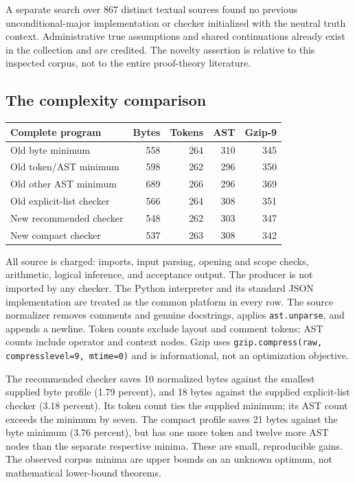 \documentclass[11pt,letterpaper]{article}
\theoremstyle{definition}\newtheorem{definition}[theorem]{Definition}
\theoremstyle{remark}\newtheorem{remark}[theorem]{Remark}
\begin{document}
A separate search over 867 distinct textual sources found no previous
unconditional-major implementation or checker initialized with the
neutral truth context. Administrative true assumptions and shared
continuations already exist in the collection and are credited. The
novelty assertion is relative to this inspected corpus, not to the entire
proof-theory literature.

\subsection{The complexity comparison}


\begin{center}\small
\begin{tabular}{lrrrr}
\toprule
Complete program & Bytes & Tokens & AST & Gzip-9\\
\midrule
Old byte minimum & 558 & 264 & 310 & 345\\
Old token/AST minimum & 598 & 262 & 296 & 350\\
Old other AST minimum & 689 & 266 & 296 & 369\\
Old explicit-list checker & 566 & 264 & 308 & 351\\
New recommended checker & 548 & 262 & 303 & 347\\
New compact checker & 537 & 263 & 308 & 342\\
\bottomrule
\end{tabular}
\end{center}



All source is charged: imports, input parsing, opening and scope checks,
arithmetic, logical inference, and acceptance output. The producer is
not imported by any checker. The Python interpreter and its standard
JSON implementation are treated as the common platform in every row.
The source normalizer removes comments and genuine docstrings, applies
\texttt{ast.unparse}, and appends a newline. Token counts exclude layout
and comment tokens; AST counts include operator and context nodes.
Gzip uses \texttt{gzip.compress(raw, compresslevel=9, mtime=0)} and is
informational, not an optimization objective.

The recommended checker saves 10 normalized bytes against the smallest
supplied byte profile (1.79 percent), and 18 bytes against the supplied
explicit-list checker (3.18 percent). Its token count ties the supplied
minimum; its AST count exceeds the minimum by seven. The compact profile
saves 21 bytes against the byte minimum (3.76 percent), but has one more
token and twelve more AST nodes than the separate respective minima.
These are small, reproducible gains. The observed corpus minima are
upper bounds on an unknown optimum, not mathematical lower-bound theorems.
\end{document}
